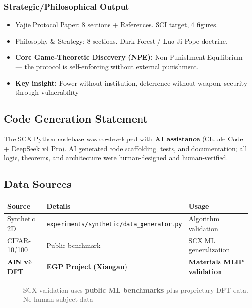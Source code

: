\documentclass[12pt]{article}
\begin{document}
\subsubsection{Strategic/Philosophical Output}
\begin{itemize}
\item Yajie Protocol Paper: 8 sections + References. SCI target, 4 figures.
\item Philosophy \& Strategy: 8 sections. Dark Forest / Luo Ji-Pope doctrine.
\item \textbf{Core Game-Theoretic Discovery (NPE):} Non-Punishment Equilibrium --- the protocol is self-enforcing without external punishment.
\item \textbf{Key insight:} Power without institution, deterrence without weapon, security through vulnerability.
\end{itemize}

\subsection{Code Generation Statement}
The SCX Python codebase was co-developed with \textbf{AI assistance} (Claude Code + DeepSeek v4 Pro). AI generated code scaffolding, tests, and documentation; all logic, theorems, and architecture were human-designed and human-verified.

\subsection{Data Sources}
\begin{longtable}{@{}p{} p{} p{}@{}}
\toprule Source & Details & Usage \\
\midrule
Synthetic 2D & \texttt{experiments/synthetic/data\_generator.py} & Algorithm validation \\
CIFAR-10/100 & Public benchmark & SCX ML generalization \\
\textbf{AlN v3 DFT} & \textbf{EGP Project (Xiaogan)} & \textbf{Materials MLIP validation} \\
\bottomrule
\end{longtable}
\begin{quote}
SCX validation uses \textbf{public ML benchmarks} plus proprietary DFT data. No human subject data.
\end{quote}
\end{document}
